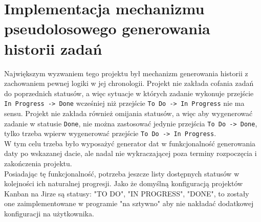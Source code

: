 \section{Implementacja mechanizmu pseudolosowego generowania historii zadań}
Największym wyzwaniem tego projektu był mechanizm generowania historii z zachowaniem pewnej logiki w jej chronologii.
Projekt nie zakłada cofania zadań do poprzednich statusów, a więc sytuacje w których zadanie wykonuje przejście \texttt{In Progress -> Done} wcześniej 
niż przejście \texttt{To Do -> In Progress} nie ma sensu.
Projekt nie zakłada również omijania statusów, a więc aby wygenerować zadanie w statusie \texttt{Done}, nie można zastosować jedynie przejścia
\texttt{To Do -> Done}, tylko trzeba wpierw wygenerować przejście \texttt{To Do -> In Progress}.\\
W tym celu trzeba było wyposażyć generator dat w funkcjonalność generowania daty po wskazanej dacie, ale nadal nie wykraczającej
poza terminy rozpoczęcia i zakończenia projektu.\\
Posiadając tę funkcjonalność, potrzeba jeszcze listy dostępnych statusów w kolejności ich naturalnej progresji.
Jako że domyślną konfiguracją projektów Kanban na Jirze są statusy: "TO DO", "IN PROGRESS", "DONE", to zostały one
zaimplementowane w programie "na sztywno" aby nie nakładać dodatkowej konfiguracji na użytkownika.
